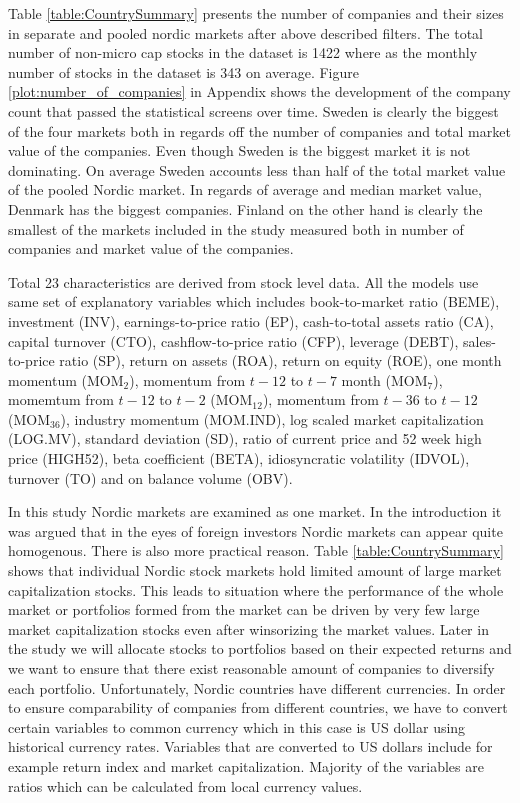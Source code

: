 \documentclass{article}
\begin{document}
Table \ref{table:CountrySummary} presents the number of companies and their sizes in separate and pooled nordic markets after above described filters. The total number of non-micro cap stocks in the dataset is 1422 where as the monthly number of stocks in the dataset is 343 on average. Figure \ref{plot:number_of_companies} in Appendix shows the development of the company count that passed the statistical screens over time. Sweden is clearly the biggest of the four markets both in regards off the number of companies and total market value of the companies. Even though Sweden is the biggest market it is not dominating. On average Sweden accounts less than half of the total market value of the pooled Nordic market. In regards of average  and median market value, Denmark has the biggest companies. Finland on the other hand is clearly the smallest of the markets included in the study measured both in number of companies and market value of the companies. 

Total 23 characteristics are derived from stock level data. All the models use same set of explanatory variables which includes book-to-market ratio (BEME), investment (INV), earnings-to-price ratio (EP), cash-to-total assets ratio (CA), capital turnover (CTO), cashflow-to-price ratio (CFP), leverage (DEBT), sales-to-price ratio (SP), return on assets (ROA), return on equity (ROE), one month momentum (MOM$_2$), momentum from $t-12$ to $t-7$ month (MOM$_7$), momemtum from $t-12$ to $t-2$ (MOM$_{12}$), momentum from $t-36$ to $t-12$ (MOM$_{36}$), industry momentum (MOM.IND), log scaled market capitalization (LOG.MV), standard deviation (SD), ratio of current price and 52 week high price (HIGH52), beta coefficient (BETA), idiosyncratic volatility (IDVOL), turnover (TO) and on balance volume (OBV). 

In this study Nordic markets are examined as one market. In the introduction it was argued that in the eyes of foreign investors Nordic markets can appear quite homogenous. There is also more practical reason. Table \ref{table:CountrySummary} shows that individual Nordic stock markets hold limited amount of large market capitalization stocks. This leads to situation where the performance of the whole market or portfolios formed from the market can be driven by very few large market capitalization stocks even after winsorizing the market values. Later in the study we will allocate stocks to portfolios based on their expected returns and we want to ensure that there exist reasonable amount of companies to diversify each portfolio. Unfortunately, Nordic countries have different currencies. In order to ensure comparability of companies from different countries, we have to convert certain variables to common currency which in this case is US dollar using historical currency rates. Variables that are converted to US dollars include for example return index and market capitalization. Majority of the variables are ratios which can be calculated from local currency values. 
\end{document}
